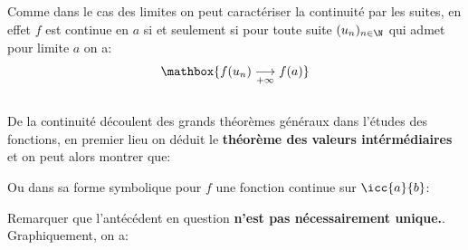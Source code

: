 \subsection*{}
Comme dans le cas des limites on peut caractériser la continuité par les suites, en effet \(f\) est continue en \(a\) si et seulement si pour toute suite \((u_n)_{n\in\N}\) qui admet pour limite \(a\) on a:
\[
   \mathbox{f(u_n) \underset{+\infty}{\longrightarrow} f(a)}   
\]
\pagebreak
\subsection*{}
De la continuité découlent des grands théorèmes généraux dans l'études des fonctions, en premier lieu on déduit le \textbf{théorème des valeurs intérmédiaires} et on peut alors montrer que:
\begin{center}
\end{center}
Ou dans sa forme symbolique pour \(f\) une fonction continue sur \(\icc{a}{b}\):
\begin{center}
\end{center}
Remarquer que l'antécédent en question \textbf{n'est pas nécessairement unique.}. Graphiquement, on a:
